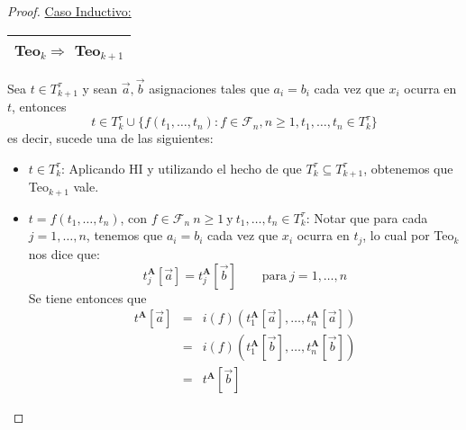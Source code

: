 \begin{proof}
		\PN \underline{Caso Inductivo:} \begin{tabular}{|c|} \hline Teo$_{k} \Rightarrow$ Teo$_{k + 1}$ \\\hline
    \end{tabular} Sea $t \in T_{k+1}^{\tau}$ y sean $\vec{a}, \vec{b}$ asignaciones tales que $a_{i} = b_{i}$ cada vez
    que $x_{i}$ ocurra en $t$, entonces
    \[
      t \in T_{k}^{\tau} \cup \{f(t_{1}, \dotsc, t_{n}): f \in \mathcal{F}_{n},n\geq 1,t_{1}, \dotsc, t_{n} \in
      T_{k}^{\tau}\}
    \]
    \PN es decir, sucede una de las siguientes:
    \begin{itemize}
      \item $t \in T_{k}^{\tau}$: Aplicando HI y utilizando el hecho de que $T_{k}^{\tau} \subseteq T_{k+1}^{\tau}$,
      obtenemos que Teo$_{k+1}$ vale.
      \item $t = f(t_{1}, \dotsc, t_{n})$, con $f \in \mathcal{F}_{n} \ n \geq 1 \ \text{y} \ t_{1}, \dotsc, t_{n} \in
      T_{k}^{\tau}$: Notar que para cada $j = 1, \dotsc, n$, tenemos que $a_{i} = b_{i}$ cada vez que $x_{i}$ ocurra en
      $t_{j}$, lo cual por Teo$_{k}$ nos dice que:
      \[
        t_{j}^{\mathbf{A}}[\vec{a}] = t_{j}^{\mathbf{A}}[\vec{b}] \qquad \text{para} \ j = 1, \dotsc, n
      \]
      \PN Se tiene entonces que
      \begin{eqnarray*}
        t^{\mathbf{A}}[\vec{a}] &=& i(f)(t_{1}^{\mathbf{A}}[\vec{a}], \dotsc, t_{n}^{\mathbf{A}}[\vec{a}]) \\
        &=& i(f)(t_{1}^{\mathbf{A}}[\vec{b}], \dotsc, t_{n}^{\mathbf{A}}[\vec{b}]) \\
        &=& t^{\mathbf{A}}[\vec{b}]
      \end{eqnarray*}
    \end{itemize}
  \end{proof}

